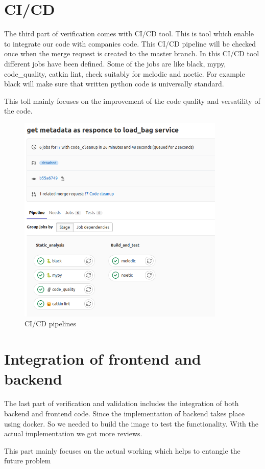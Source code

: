\section{CI/CD}
The third part of verification comes with CI/CD tool. This is tool which enable to integrate our code with companies code. This CI/CD pipeline will be checked once when the merge request is created to the master branch. In this CI/CD tool different jobs have been defined. Some of the jobs are like black, mypy, code\_quality, catkin lint, check suitably for melodic and noetic. For example black will make sure that written python code is universally standard. 

This toll mainly focuses on the improvement of the code quality and versatility of the code. 

\begin{figure}[h]
	\begin{center}
		\includegraphics[height=10cm]{images/cicd.png}
		\caption{CI/CD pipelines}
	\end{center}
\end{figure}
\pagebreak
\section{Integration of frontend and backend}
The last part of verification and validation includes the integration of both backend and frontend code. Since the implementation of backend takes place using docker. So we needed to build the image to test the functionality. With the actual implementation we got more reviews. 

This part mainly focuses on the actual working which helps to entangle the future problem